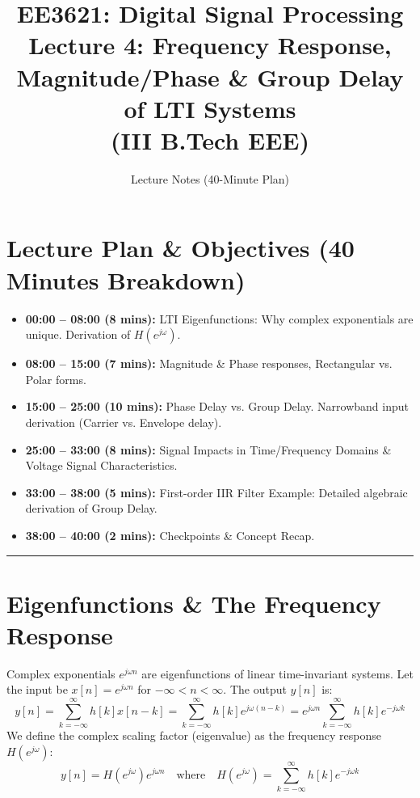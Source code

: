 \documentclass[11pt,a4paper]{article}
\title{\textbf{EE3621: Digital Signal Processing} \\ \Large Lecture 4: Frequency Response, Magnitude/Phase \& Group Delay of LTI Systems \\ \large (III B.Tech EEE)}
\author{Lecture Notes (40-Minute Plan)}
\date{}
\begin{document}
\maketitle

\section{Lecture Plan \& Objectives (40 Minutes Breakdown)}
\begin{itemize}
    \item \textbf{00:00 -- 08:00 (8 mins):} LTI Eigenfunctions: Why complex exponentials are unique. Derivation of $H(e^{j\omega})$.
    \item \textbf{08:00 -- 15:00 (7 mins):} Magnitude \& Phase responses, Rectangular vs. Polar forms.
    \item \textbf{15:00 -- 25:00 (10 mins):} Phase Delay vs. Group Delay. Narrowband input derivation (Carrier vs. Envelope delay).
    \item \textbf{25:00 -- 33:00 (8 mins):} Signal Impacts in Time/Frequency Domains \& Voltage Signal Characteristics.
    \item \textbf{33:00 -- 38:00 (5 mins):} First-order IIR Filter Example: Detailed algebraic derivation of Group Delay.
    \item \textbf{38:00 -- 40:00 (2 mins):} Checkpoints \& Concept Recap.
\end{itemize}

\noindent\rule{\textwidth}{0.5pt}

\section{Eigenfunctions \& The Frequency Response}
Complex exponentials $e^{j\omega n}$ are eigenfunctions of linear time-invariant systems.
Let the input be $x[n] = e^{j\omega n}$ for $-\infty < n < \infty$. The output $y[n]$ is:
\begin{equation}
y[n] = \sum_{k=-\infty}^{\infty} h[k] x[n-k] = \sum_{k=-\infty}^{\infty} h[k] e^{j\omega(n-k)} = e^{j\omega n} \sum_{k=-\infty}^{\infty} h[k] e^{-j\omega k}
\end{equation}
We define the complex scaling factor (eigenvalue) as the frequency response $H(e^{j\omega})$:
\begin{equation}
y[n] = H(e^{j\omega}) e^{j\omega n} \quad \text{where} \quad H(e^{j\omega}) = \sum_{k=-\infty}^{\infty} h[k] e^{-j\omega k}
\end{equation}
\end{document}
